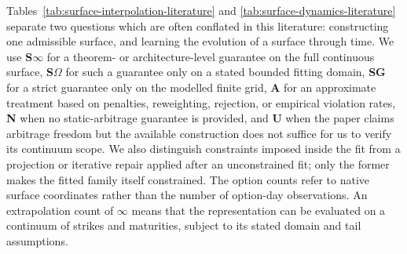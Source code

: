 \documentclass[11pt,a4paper]{article}
\begin{document}
\iffalse %
Tables~\ref{tab:surface-interpolation-literature} and
\ref{tab:surface-dynamics-literature} separate two questions which are often
conflated in this literature: constructing one admissible surface, and learning
the evolution of a surface through time.  We use \textbf{S$\infty$} for a
theorem- or architecture-level guarantee on the full continuous surface,
\textbf{S$\Omega$} for such a guarantee only on a stated bounded fitting domain,
\textbf{SG} for a strict guarantee only on the modelled finite grid, \textbf{A}
for an approximate treatment based on penalties, reweighting, rejection, or
empirical violation rates, \textbf{N} when no static-arbitrage guarantee is
provided, and \textbf{U} when the paper claims arbitrage freedom but the
available construction does not suffice for us to verify its continuum scope.
We also distinguish constraints imposed inside the fit from a projection or
iterative repair applied after an unconstrained fit; only the former makes the
fitted family itself constrained.
The option counts refer to native surface coordinates rather than the number of
option-day observations.  An extrapolation count of $\infty$ means that the
representation can be evaluated on a continuum of strikes and maturities,
subject to its stated domain and tail assumptions.
\end{document}
